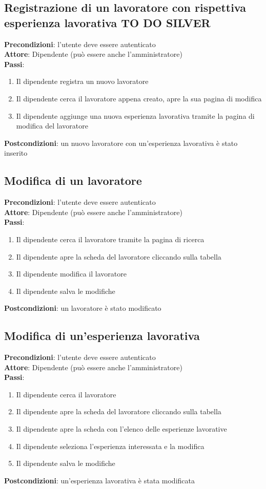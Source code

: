 \documentclass[ 4paper,11pt,openany]{book}
\begin{document}
\subsection{Registrazione di un lavoratore con rispettiva esperienza lavorativa TO DO SILVER}
\textbf{Precondizioni}: l'utente deve essere autenticato\\
\textbf{Attore}: Dipendente (può essere anche l'amministratore)\\
\textbf{Passi}:
\begin{enumerate}
\item Il dipendente registra un nuovo lavoratore
\item Il dipendente cerca il lavoratore appena creato, apre la sua pagina di modifica 
\item Il dipendente aggiunge una nuova esperienza lavorativa tramite la pagina di modifica del lavoratore
\end{enumerate}
\textbf{Postcondizioni}: un nuovo lavoratore con un'esperienza lavorativa è stato inserito\\

\subsection{Modifica di un lavoratore}
\textbf{Precondizioni}: l'utente deve essere autenticato\\
\textbf{Attore}: Dipendente (può essere anche l'amministratore)\\
\textbf{Passi}:
\begin{enumerate}
\item Il dipendente cerca il lavoratore tramite la pagina di ricerca
\item Il dipendente apre la scheda del lavoratore cliccando sulla tabella 
\item Il dipendente modifica il lavoratore
\item Il dipendente salva le modifiche
\end{enumerate}
\textbf{Postcondizioni}: un lavoratore è stato modificato\\

\subsection{Modifica di un'esperienza lavorativa}
\textbf{Precondizioni}: l'utente deve essere autenticato\\
\textbf{Attore}: Dipendente (può essere anche l'amministratore)\\
\textbf{Passi}:
\begin{enumerate}
\item Il dipendente cerca il lavoratore
\item Il dipendente apre la scheda del lavoratore cliccando sulla tabella
\item Il dipendente apre la scheda con l'elenco delle esperienze lavorative
\item Il dipendente seleziona l'esperienza interessata e la modifica
\item Il dipendente salva le modifiche
\end{enumerate}
\textbf{Postcondizioni}: un'esperienza lavorativa è stata modificata\\
\end{document}
